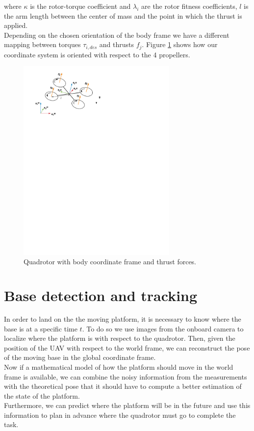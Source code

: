 where $\kappa$ is the rotor-torque coefficient and $\lambda_i$ are the rotor fitness coefficients, $l$ is the arm length between the center of mass and the point in which the thrust is applied. \\
Depending on the chosen orientation of the body frame we have a different mapping between torques $\tau_{i,des}$ and thrusts $f_j$. Figure \ref{fig:bodyframe} shows how our coordinate system is oriented with respect to the 4 propellers.

\begin{figure}[!ht]
    \centering
    \includegraphics[width=0.7\textwidth]{img/quadrotor.pdf}
    \caption{Quadrotor with body coordinate frame and thrust forces.}
    \label{fig:bodyframe}
\end{figure}

\section{Base detection and tracking}\label{sec:base_estimation}
In order to land on the the moving platform, it is necessary to know where the base is at a specific time $t$. To do so we use images from the onboard camera to localize where the platform is with respect to the quadrotor. Then, given the position of the UAV with respect to the world frame, we can reconstruct the pose of the moving base in the global coordinate frame. \\
Now if a mathematical model of how the platform should move in the world frame  is available, we can combine the noisy information from the measurements with the theoretical pose  that it should have  to compute a better estimation of the state of the platform.  \\
Furthermore, we can predict where the platform will be in the future and use this information to plan in advance where the quadrotor must go to complete the task.\\

